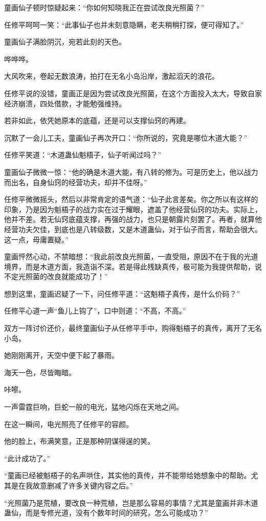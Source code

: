 \begin{this_body}
童画仙子顿时惊疑起来：“你如何知晓我正在尝试改良光照菌？”

任修平呵呵一笑：“此事仙子也并未刻意隐瞒，老夫稍稍打探，便可得知了。”

童画仙子满脸阴沉，宛若此刻的天色。

哗哗哗。

大风吹来，卷起无数浪涛，拍打在无名小岛沿岸，激起滔天的浪花。

任修平说的没错，童画正是因为尝试改良光照菌，在这个方面投入太大，导致自家经济崩溃，四处借款，才能勉强维持。

若非如此，依凭她原本的底蕴，还是可以支撑仙窍的再建。

沉默了一会儿工夫，童画仙子再次开口：“你所说的，究竟是哪位木道大能？”

任修平笑道：“木道蛊仙魁梧子，仙子听闻过吗？”

童画仙子微微一惊：“他的确是木道大能，有八转的修为。可是历史上，他以战力而出名，自身仙窍的经营功夫，却并不佳呀。”

任修平微微摇头，然后以非常肯定的语气道：“仙子此言差矣。你之所以有这样的印象，乃是因为魁梧子的战力实在过于耀眼，遮盖了他经营仙窍的功夫。实际上，他并不差。若无仙窍底蕴支撑，再强的战力，也只是朝露片刻罢了。再者，就算他经营功夫欠佳，到底也是八转级数，又是木道蛊仙，对于仙子而言，帮助会很大。这一点，毋庸置疑。”

童画怦然心动，不禁暗想：“我此前改良光照菌，一直受阻，原因不在于我的光道境界，而是木道方面，我造诣不深。若是得此残缺真传，极可能为我提供帮助，说不定光照菌的改良就能成功了！”

想到这里，童画迟疑了一下，问任修平道：“这魁梧子真传，是什么价码？”

任修平心道一声“鱼儿上钩了”，口中则道：“不高，不高。”

双方一阵讨价还价，最终童画仙子从任修平手中，购得魁梧子的真传，离开了无名小岛。

她刚刚离开，天空中便下起了暴雨。

海天一色，尽皆晦暗。

咔嚓。

一声雷霆巨响，巨蛇一般的电光，猛地闪烁在天地之间。

在这一瞬间，电光照亮了任修平的容颜。

他的脸上，布满笑意，正是那种阴谋得逞的笑。

“此计成功了。”

“童画已经被魁梧子的名声哄住，其实他的真传，并不能带给她想象中的帮助。尤其是在我故意删减了许多关键内容之后。”

“光照菌乃是荒植，要改良一种荒植，岂是那么容易的事情？尤其是童画并非木道蛊仙，而是专修光道，没有个数年时间的研究，怎么可能成功？”


\end{this_body}
